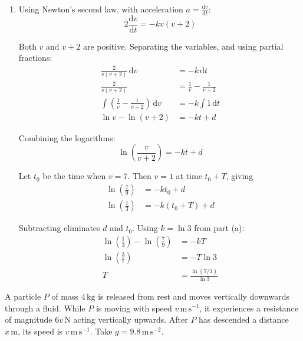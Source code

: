 \documentclass[leqno]{article}
\begin{document}
\begin{enumerate}[
  label=\textbf{\arabic*.},
  leftmargin=*,
  topsep=0pt,
  partopsep=0pt,
  parsep=0pt
]
\begin{djsSolution}
\begin{enumerate}[label=\textbf{(\alph*)}, start=1]
\item Using Newton's second law, with acceleration \(a=\frac{\mathrm{d}v}{\mathrm{d}t}\):
\[
2\frac{\mathrm{d}v}{\mathrm{d}t}=-kv(v+2)
\]

Both \(v\) and \(v+2\) are positive. Separating the variables, and using partial fractions:
\begin{align*}
\frac{2}{v(v+2)}\,\mathrm{d}v&=-k\,\mathrm{d}t\\
\frac{2}{v(v+2)}&=\frac{1}{v}-\frac{1}{v+2}\\
\int\left(\frac{1}{v}-\frac{1}{v+2}\right)\,\mathrm{d}v&=-k\int 1\,\mathrm{d}t\\
\ln v-\ln(v+2)&=-kt+d
\end{align*}

Combining the logarithms:
\[
\ln\left(\frac{v}{v+2}\right)=-kt+d
\]

Let \(t_0\) be the time when \(v=7\). Then \(v=1\) at time \(t_0+T\), giving
\begin{align*}
\ln\left(\frac{7}{9}\right)&=-kt_0+d\\
\ln\left(\frac{1}{3}\right)&=-k(t_0+T)+d
\end{align*}

Subtracting eliminates \(d\) and \(t_0\). Using \(k=\ln 3\) from part (a):
\begin{align*}
\ln\left(\frac{1}{3}\right)-\ln\left(\frac{7}{9}\right)&=-kT\\
\ln\left(\frac{3}{7}\right)&=-T\ln 3\\
T&=\frac{\ln(7/3)}{\ln 3}
\end{align*}
\end{enumerate}
\end{djsSolution}

\newpage

\questionitem

A particle $P$ of mass $4\,\mathrm{kg}$ is released from rest and moves vertically downwards through a fluid. While $P$ is moving with speed $v\,\mathrm{m\,s^{-1}}$, it experiences a resistance of magnitude $6v\,\mathrm{N}$ acting vertically upwards. After $P$ has descended a distance $x\,\mathrm{m}$, its speed is $v\,\mathrm{m\,s^{-1}}$. Take $g=9.8\,\mathrm{m\,s^{-2}}$. \\


\end{enumerate}
\end{document}
